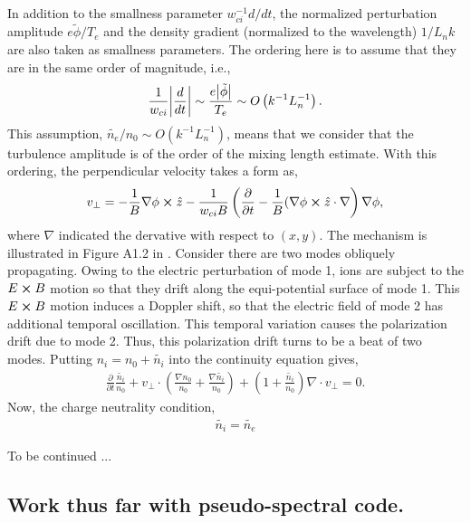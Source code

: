 In addition to the smallness parameter $w_{ci}^{-1} d/dt$, the normalized perturbation amplitude $e \tilde{\phi}/ T_e$ and the density gradient (normalized to the wavelength) $1/L_n k$ are also taken as smallness parameters. The ordering here is to assume that they are in the same order of magnitude, i.e.,
\begin{align}
	\frac{1}{w_{ci}} \abs{\frac{d}{dt}} \sim \frac{e \abs{\tilde{\phi}}}{T_e} \sim O \left(k^{-1} L_n^{-1} \right).
\end{align}
This assumption, $\tilde{n_e}/n_0 \sim O \left(k^{-1} L_n^{-1} \right)$, means that we consider that the turbulence amplitude is of the order of the mixing length estimate. With this ordering, the perpendicular velocity takes a form as, 
\begin{align}
	v_{\perp} = - \frac{1}{B} \nabla \phi \cross \hat{z} - \frac{1}{w_{ci} B} \left(\frac{\partial}{\partial t} - \frac{1}{B} (\nabla \phi \cross \hat{z} \cdot \nabla  \right) \nabla \phi,
\end{align}
where $\nabla$ indicated the dervative with respect to $(x,y)$. The mechanism is illustrated in Figure A1.2 in \cite{diamond_itoh_itoh_2010}. Consider there are two modes obliquely propagating. Owing to the electric perturbation of mode 1, ions are subject to the $E \cross B$ motion so that they drift along the equi-potential surface of mode 1. This $E \cross B$ motion induces a Doppler shift, so that the electric field of mode 2 has additional temporal oscillation. This temporal variation causes the polarization drift due to mode 2. Thus, this polarization drift turns to be a beat of two modes. Putting $n_i = n_0 + \tilde{n_i}$ into the continuity equation gives, 
\begin{align}
	\frac{\partial}{\partial t} \frac{\tilde{n_i}}{n_0} + v_{\perp} \cdot \left(\frac{\nabla n_0}{n_0} + \frac{\nabla \tilde{n_i}}{n_0} \right) + \left(1 + \frac{\tilde{n_i}}{n_0} \right) \nabla \cdot v_{\perp} = 0.
\end{align}
Now, the charge neutrality condition, 
\begin{align}
	\tilde{n_i} = \tilde{n_e}
\end{align}

To be continued \cite{diamond_itoh_itoh_2010}...

\subsection{Work thus far with pseudo-spectral code.}

